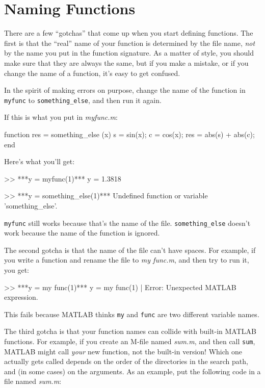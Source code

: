 
\section{Naming Functions}

There are a few ``gotchas'' that come up when you start defining functions.
The first is that the ``real'' name of your function is determined by the file name, {\em not} by the name you put in the function signature.  As a matter of style, you
should make sure that they are always the same, but if you
make a mistake, or if you change the name of a function, it's
easy to get confused.


In the spirit of making errors on purpose, change the name of
the function in \verb"myfunc" to \verb"something_else", and
then run it again.

If this is what you put in \emph{myfunc.m}:

\begin{code}
function res = something_else (x)
    s = sin(x);
    c = cos(x);
    res = abs(s) + abs(c);
end
\end{code}

Here's what you'll get:

\begin{code}
>> ***y = myfunc(1)***
y = 1.3818

>> ***y = something_else(1)***
Undefined function or variable 'something_else'.
\end{code}

{\tt myfunc} still works because that's the name of the file.
\verb"something_else" doesn't work because the name of the function is ignored.

The second gotcha is that the name of the file can't have spaces.
For example, if you write a function and rename the file to 
{\em my func.m},
and then try to run it, you get:

\begin{code}
>> ***y = my func(1)***
 y = my func(1)
        |
Error: Unexpected MATLAB expression.
\end{code}

This fails because MATLAB thinks \verb"my" and \verb"func" are two different
variable names.

The third gotcha is that your function names can collide with built-in
MATLAB functions.  For example, if you create an M-file named {\em sum.m}, and then call {\tt sum}, MATLAB might call {\em your} new
function, not the built-in version!  Which one actually gets called
depends on the order of the directories in the search path, and
(in some cases) on the arguments.  As an example, put the following
code in a file named {\em sum.m}:


